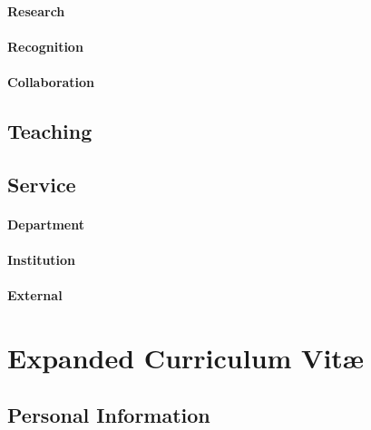 \documentclass[letterpaper,12pt,times]{article}
\newif\ifinstr
\newcommand{\instr}[1]{
  \ifinstr
    \begin{leftbar}%
      \begin{color}{ColoradoRed}%
        \itshape
        \noindent%
        \ignorespaces%
        #1
      \end{color}
    \end{leftbar}%
  \else
  \fi
}
\begin{document}
\paragraph{Research}

\paragraph{Recognition}

\paragraph{Collaboration}

\subsection{Teaching}

\subsection{Service}

\paragraph{Department}

\paragraph{Institution}

\paragraph{External}

\clearpage
\section{Expanded Curriculum Vit\ae}

\instr{
Data required for the expanded curriculum vitae should largely be available in
previous Faculty Data Reports.
}

\subsection{Personal Information}
\instr{
  Should include a brief listing of the following elements:
  \begin{itemize}
  \item Personal Data
    \begin{itemize}
    \item Name
    \item Address (Home)
    \item Citizenship (if applicable)
    \end{itemize}

  \item Education (Name and location of schools; degrees and dates)

  \item Employment History (Date, title and major responsibilities)
  \end{itemize}
}
\end{document}
